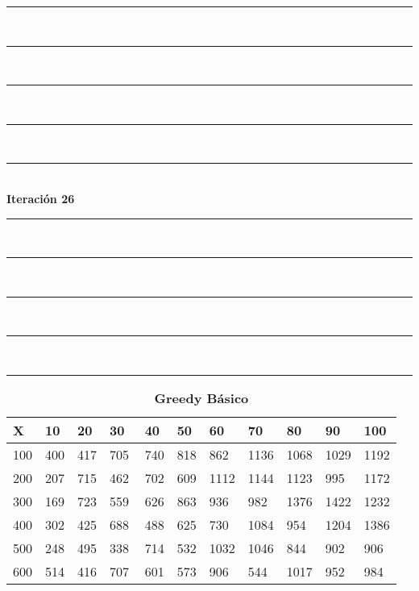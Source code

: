 \documentclass[10pt,letterpaper]{article}
\begin{document}
\newpage 
\begin{center}
\newcommand{\HRule}{\rule{\linewidth}{0.5mm}}
\center
\HRule\\[6cm]
\HRule\\[0.4cm]
\HRule\\[0.4cm]
\HRule\\[0.4cm]
\HRule\\[0.4cm]
{\centering \Huge\bfseries Iteración 26}\\[0.4cm]
\HRule\\[0.4cm]
\HRule\\[0.4cm]
\HRule\\[0.4cm]
\HRule\\[6cm]
\HRule
\end{center}
\newpage 
{}
\begin{center}
\begin{table}\renewcommand{\arraystretch}{2.5}
\caption{\large \textbf{Greedy Básico}}
\centering
\begin{tabular} { |m{0.5cm}|m{1.3cm}|m{1.3cm}|m{1.3cm}|m{1.3cm}|m{1.3cm}|m{1.3cm}|m{1.3cm}|m{1.3cm}|m{1.3cm}|m{1.3cm}|} 
\hline
\rowcolor{Gray}
\centering \textbf{X} & \centering \textbf{10} & \centering \textbf{20} & \centering \textbf{30}\ & \centering \textbf{40} & \centering \textbf{50} & \centering \textbf{60}\ & \centering \textbf{70} & \centering \textbf{80} & \centering \textbf{90}\ & \textbf{100} \\\hline
\cellcolor{Gray}100 & \Large 400 & \Large 417 & \Large 705 & \Large 740 & \Large 818 & \Large 862 & \Large 1136 & \Large 1068 & \Large 1029 & \Large 1192 \\
\hline
\cellcolor{Gray}200 & \Large 207 & \Large 715 & \Large 462 & \Large 702 & \Large 609 & \Large 1112 & \Large 1144 & \Large 1123 & \Large 995 & \Large 1172 \\
\hline
\cellcolor{Gray}300 & \Large 169 & \Large 723 & \Large 559 & \Large 626 & \Large 863 & \Large 936 & \Large 982 & \Large 1376 & \Large 1422 & \Large 1232 \\
\hline
\cellcolor{Gray}400 & \Large 302 & \Large 425 & \Large 688 & \Large 488 & \Large 625 & \Large 730 & \Large 1084 & \Large 954 & \Large 1204 & \Large 1386 \\
\hline
\cellcolor{Gray}500 & \Large 248 & \Large 495 & \Large 338 & \Large 714 & \Large 532 & \Large 1032 & \Large 1046 & \Large 844 & \Large 902 & \Large 906 \\
\hline
\cellcolor{Gray}600 & \Large 514 & \Large 416 & \Large 707 & \Large 601 & \Large 573 & \Large 906 & \Large 544 & \Large 1017 & \Large 952 & \Large 984 \\

\end{tabular}
\end{table}
\end{center}
\end{document}
